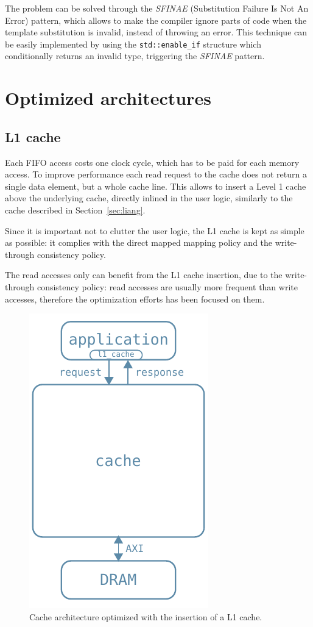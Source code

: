 \documentclass[11pt,a4paper]{memoir}
\begin{document}
The problem can be solved through the \emph{SFINAE} (Substitution Failure Is
Not An Error) pattern, which allows to make the compiler ignore parts of code
when the template substitution is invalid, instead of throwing an error.
This technique can be easily implemented by using the \texttt{std::enable\_if}
structure which conditionally returns an invalid type, triggering the
\emph{SFINAE} pattern.

\chapter{Optimized architectures}
\section{L1 cache}
Each FIFO access costs one clock cycle, which has to be paid for each memory
access. 
To improve performance each read request to the cache does not return a single
data element, but a whole cache line. This allows to insert a Level 1 cache
above the underlying cache, directly inlined in the user logic, similarly to
the cache described in Section~\ref{sec:liang}.

Since it is important not to clutter the user logic, the L1 cache is kept as
simple as possible: it complies with the direct mapped mapping policy and the
write-through consistency policy.

The read accesses only can benefit from the L1 cache insertion, due to the
write-through consistency policy: read accesses are usually more frequent than
write accesses, therefore the optimization efforts has been focused on them.

\begin{figure}
	\centering
	\includegraphics[width=.3\textwidth]{l1_arch}
	\caption{Cache architecture optimized with the insertion of a L1 cache.}
	\label{fig:l1_arch}
\end{figure}
\end{document}
